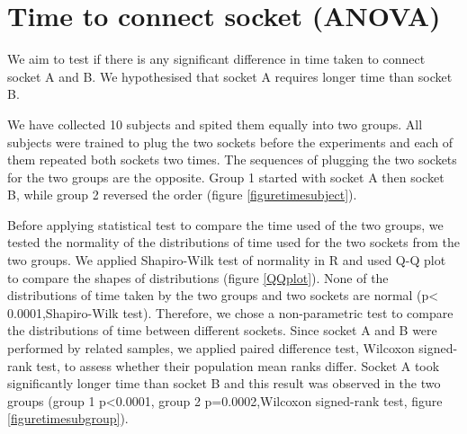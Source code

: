 




\section{Time to connect socket (ANOVA)}
\label{app:anova_socket}


We aim to test if there is any significant difference in time taken to connect socket A and B. We hypothesised that socket A requires longer time than socket B. 


We have collected 10 subjects and spited them equally into two groups. All subjects were trained to plug the two sockets before the experiments and each of them repeated both sockets two times. The sequences of plugging the two sockets for the two groups are the opposite. Group 1 started with socket A then socket B, while group 2 reversed the order (figure \ref{figuretimesubject}). 


Before applying statistical test to compare the time used of the two groups, we tested the normality of the distributions of time used for the two sockets from the two groups. We applied Shapiro-Wilk test of normality in R and used Q-Q plot to compare the shapes of distributions (figure \ref{QQplot}). None of the distributions of time taken by the two groups and two sockets are normal (p< 0.0001,Shapiro-Wilk test). Therefore, we chose a non-parametric test to compare the distributions of time between different sockets. Since socket A and B were performed by related samples, we applied paired difference test, Wilcoxon signed-rank test, to assess whether their population mean ranks differ. Socket A took significantly longer time than socket B and this result was observed in the two groups (group 1 p<0.0001, group 2 p=0.0002,Wilcoxon signed-rank test, figure \ref{figuretimesubgroup}).   




